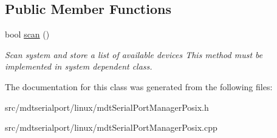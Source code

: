 \subsection*{Public Member Functions}
\begin{DoxyCompactItemize}
\item 
\hypertarget{classmdt_serial_port_manager_posix_af87182039bc36dc4e1d73638affaf1c3}{
bool \hyperlink{classmdt_serial_port_manager_posix_af87182039bc36dc4e1d73638affaf1c3}{scan} ()}
\label{classmdt_serial_port_manager_posix_af87182039bc36dc4e1d73638affaf1c3}

\begin{DoxyCompactList}\small\item\em Scan system and store a list of available devices This method must be implemented in system dependent class. \end{DoxyCompactList}\end{DoxyCompactItemize}


The documentation for this class was generated from the following files:\begin{DoxyCompactItemize}
\item 
src/mdtserialport/linux/mdtSerialPortManagerPosix.h\item 
src/mdtserialport/linux/mdtSerialPortManagerPosix.cpp\end{DoxyCompactItemize}
